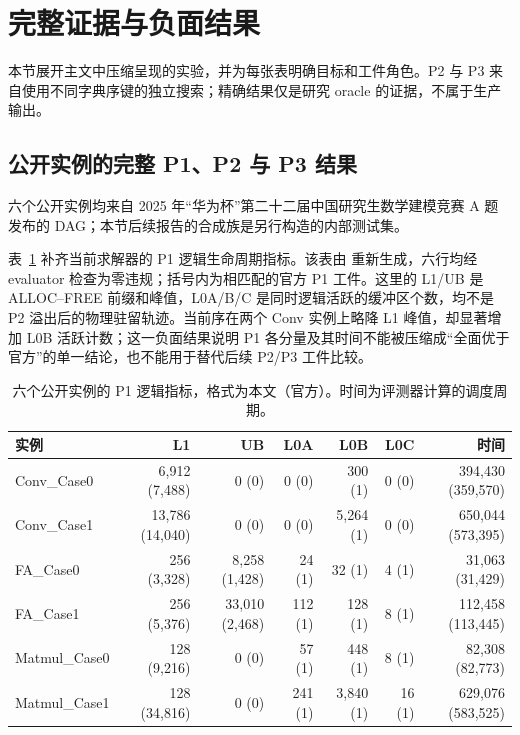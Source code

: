 \section{完整证据与负面结果}\label{sec:supp-cgo-zh}

本节展开主文中压缩呈现的实验，并为每张表明确目标和工件角色。P2 与 P3 来自使用不同字典序键的独立搜索；精确结果仅是研究 oracle 的证据，不属于生产输出。

\subsection{公开实例的完整 P1、P2 与 P3 结果}\label{sec:supp-public-zh}

六个公开实例均来自 2025 年“华为杯”第二十二届中国研究生数学建模竞赛 A
题发布的 DAG；本节后续报告的合成族是另行构造的内部测试集。

表~\ref{tab:supp-public-p1-zh} 补齐当前求解器的 P1 逻辑生命周期指标。该表由
 重新生成，六行均经
evaluator 检查为零违规；括号内为相匹配的官方 P1 工件。这里的 L1/UB 是
ALLOC--FREE 前缀和峰值，L0A/B/C 是同时逻辑活跃的缓冲区个数，均不是 P2
溢出后的物理驻留轨迹。当前序在两个 Conv 实例上略降 L1 峰值，却显著增加
L0B 活跃计数；这一负面结果说明 P1 各分量及其时间不能被压缩成“全面优于
官方”的单一结论，也不能用于替代后续 P2/P3 工件比较。

\begin{table}[htbp]\centering
\caption{六个公开实例的 P1 逻辑指标，格式为本文（官方）。时间为评测器计算的调度周期。}
\label{tab:supp-public-p1-zh}
\setlength{\tabcolsep}{3pt}
\begin{tabular}{@{}lrrrrrr@{}}\toprule
实例 & L1 & UB & L0A & L0B & L0C & 时间\\\midrule
Conv\_Case0 & 6,912 (7,488) & 0 (0) & 0 (0) & 300 (1) & 0 (0) & 394,430 (359,570)\\
Conv\_Case1 & 13,786 (14,040) & 0 (0) & 0 (0) & 5,264 (1) & 0 (0) & 650,044 (573,395)\\
FA\_Case0 & 256 (3,328) & 8,258 (1,428) & 24 (1) & 32 (1) & 4 (1) & 31,063 (31,429)\\
FA\_Case1 & 256 (5,376) & 33,010 (2,468) & 112 (1) & 128 (1) & 8 (1) & 112,458 (113,445)\\
Matmul\_Case0 & 128 (9,216) & 0 (0) & 57 (1) & 448 (1) & 8 (1) & 82,308 (82,773)\\
Matmul\_Case1 & 128 (34,816) & 0 (0) & 241 (1) & 3,840 (1) & 16 (1) & 629,076 (583,525)\\
\bottomrule
\end{tabular}
\end{table}

